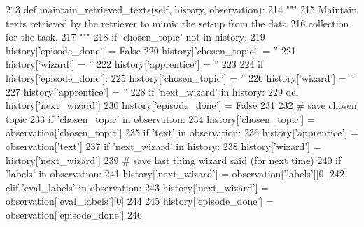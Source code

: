 \begin{DoxyCode}
213     \textcolor{keyword}{def }maintain\_retrieved\_texts(self, history, observation):
214         \textcolor{stringliteral}{"""}
215 \textcolor{stringliteral}{        Maintain texts retrieved by the retriever to mimic the set-up from the data}
216 \textcolor{stringliteral}{        collection for the task.}
217 \textcolor{stringliteral}{        """}
218         \textcolor{keywordflow}{if} \textcolor{stringliteral}{'chosen\_topic'} \textcolor{keywordflow}{not} \textcolor{keywordflow}{in} history:
219             history[\textcolor{stringliteral}{'episode\_done'}] = \textcolor{keyword}{False}
220             history[\textcolor{stringliteral}{'chosen\_topic'}] = \textcolor{stringliteral}{''}
221             history[\textcolor{stringliteral}{'wizard'}] = \textcolor{stringliteral}{''}
222             history[\textcolor{stringliteral}{'apprentice'}] = \textcolor{stringliteral}{''}
223 
224         \textcolor{keywordflow}{if} history[\textcolor{stringliteral}{'episode\_done'}]:
225             history[\textcolor{stringliteral}{'chosen\_topic'}] = \textcolor{stringliteral}{''}
226             history[\textcolor{stringliteral}{'wizard'}] = \textcolor{stringliteral}{''}
227             history[\textcolor{stringliteral}{'apprentice'}] = \textcolor{stringliteral}{''}
228             \textcolor{keywordflow}{if} \textcolor{stringliteral}{'next\_wizard'} \textcolor{keywordflow}{in} history:
229                 del history[\textcolor{stringliteral}{'next\_wizard'}]
230             history[\textcolor{stringliteral}{'episode\_done'}] = \textcolor{keyword}{False}
231 
232         \textcolor{comment}{# save chosen topic}
233         \textcolor{keywordflow}{if} \textcolor{stringliteral}{'chosen\_topic'} \textcolor{keywordflow}{in} observation:
234             history[\textcolor{stringliteral}{'chosen\_topic'}] = observation[\textcolor{stringliteral}{'chosen\_topic'}]
235         \textcolor{keywordflow}{if} \textcolor{stringliteral}{'text'} \textcolor{keywordflow}{in} observation:
236             history[\textcolor{stringliteral}{'apprentice'}] = observation[\textcolor{stringliteral}{'text'}]
237         \textcolor{keywordflow}{if} \textcolor{stringliteral}{'next\_wizard'} \textcolor{keywordflow}{in} history:
238             history[\textcolor{stringliteral}{'wizard'}] = history[\textcolor{stringliteral}{'next\_wizard'}]
239         \textcolor{comment}{# save last thing wizard said (for next time)}
240         \textcolor{keywordflow}{if} \textcolor{stringliteral}{'labels'} \textcolor{keywordflow}{in} observation:
241             history[\textcolor{stringliteral}{'next\_wizard'}] = observation[\textcolor{stringliteral}{'labels'}][0]
242         \textcolor{keywordflow}{elif} \textcolor{stringliteral}{'eval\_labels'} \textcolor{keywordflow}{in} observation:
243             history[\textcolor{stringliteral}{'next\_wizard'}] = observation[\textcolor{stringliteral}{'eval\_labels'}][0]
244 
245         history[\textcolor{stringliteral}{'episode\_done'}] = observation[\textcolor{stringliteral}{'episode\_done'}]
246 
\end{DoxyCode}

